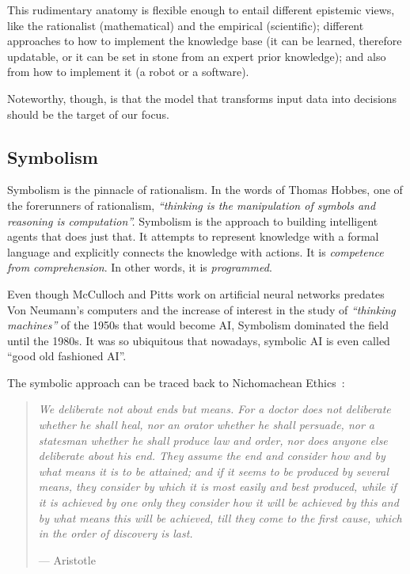 This rudimentary anatomy is flexible enough to entail different epistemic views, like the rationalist (mathematical) and the empirical (scientific); different approaches to how to implement the knowledge base (it can be learned, therefore updatable, or it can be set in stone from an expert prior knowledge); and also from how to implement it (a robot or a software).

Noteworthy, though, is that the model that transforms input data into decisions should be the target of our focus.

\subsection{Symbolism} Symbolism is the pinnacle of rationalism. In the words of Thomas Hobbes, one of the forerunners of rationalism, \emph{``thinking is the manipulation of symbols and reasoning is computation''.} Symbolism is the approach to building intelligent agents that does just that. It attempts to represent knowledge with a formal language and explicitly connects the knowledge with actions. It is \emph{competence from comprehension}. In other words, it is \emph{programmed}.

Even though McCulloch and Pitts work on artificial neural networks predates Von Neumann's computers and the increase of interest in the study of \emph{``thinking machines''} of the 1950s that would become AI, Symbolism dominated the field until the 1980s. It was so ubiquitous that nowadays, symbolic AI is even called ``good old fashioned AI''\cite{russell:2010}.

The symbolic approach can be traced back to Nichomachean Ethics~\cite{aristotle:2000}:
\begin{quotation}

	\small \emph{
		We deliberate not about ends but means. For a doctor does not deliberate whether he shall heal, nor an orator whether he shall persuade, nor a statesman whether he shall produce law and order, nor does anyone else deliberate about his end. They assume the end and consider how and by what means it is to be attained; and if it seems to be produced by several means, they consider by which it is most easily and best produced, while if it is achieved by one only they consider how it will be achieved by this and by what means this will be achieved, till they come to the first cause, which in the order of discovery is last.
		}

	\flushright{} --- Aristotle\
\end{quotation}

